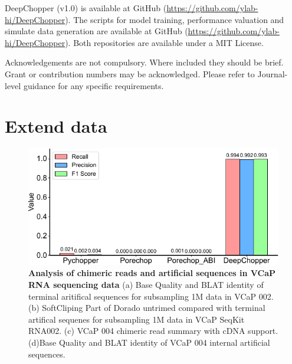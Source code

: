 \documentclass[pdflatex, sn-mathphys-num, lineno]{sn-jnl}%
\theoremstyle{thmstyleone}%
\theoremstyle{thmstyletwo}%
\theoremstyle{thmstylethree}%
\begin{document}

DeepChopper (v1.0) is available at GitHub (\url{https://github.com/ylab-hi/DeepChopper}).
The scripts for model training, performance valuation and simulate data generation are available at GitHub (\url{https://github.com/ylab-hi/DeepChopper}).
Both repositories are available under a MIT License.


Acknowledgements are not compulsory. Where included they should be brief. Grant or contribution numbers may be acknowledged.
Please refer to Journal-level guidance for any specific requirements.


\backmatter

\begin{appendices}
    \printglossary[type=\acronymtype, title=Abbreviations]

\end{appendices}






\newpage

\section{Extend data}

\renewcommand{\figurename}{Extended Data Fig.}


 \begin{figure}[!h]
     \includegraphics[height=0.65\columnwidth]{figures/finals/sf1}
     \caption{ {\bf Analysis of chimeric reads and artificial sequences in VCaP RNA sequencing data } (a) Base Quality and BLAT identity of terminal aritifical sequences for subsampling 1M data in VCaP 002. (b) SoftCliping Part of Dorado untrimed compared with terminal artifical sequenes for subsampling 1M data in VCaP SeqKit RNA002. (c) VCaP 004 chimeric read summary with cDNA support. (d)Base Quality and BLAT identity of VCaP 004 internal artificial sequences.}
     \label{fig:sf1}
 \end{figure}
\end{document}
